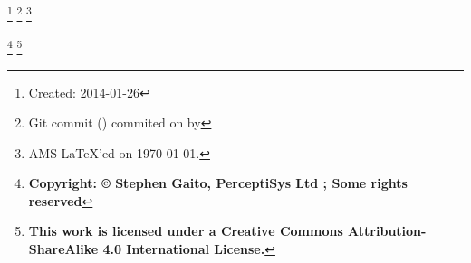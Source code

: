 \author{Stephen Gaito}
\address{PerceptiSys Ltd, 21 Gregory Ave, Coventry, CV3 6DJ, United Kingdom}%
%


\thanks{Created: 2014-01-26}
\thanks{Git commit \gitReferences{} (\gitAbbrevHash{}) commited on \gitAuthorDate{} by \gitAuthorName{}}
\thanks{AMS-\LaTeX{}'ed on \today{}.}

\thanks{\textbf{Copyright: \copyright{} Stephen Gaito, PerceptiSys Ltd \the\year{}; Some rights reserved}}
\thanks{\textbf{This work is licensed under a Creative Commons Attribution-ShareAlike 4.0 International License.}}
